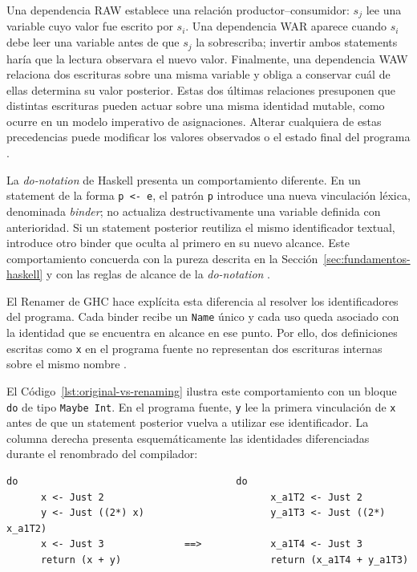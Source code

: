 Una dependencia RAW establece una relación productor--consumidor: $s_j$ lee una variable cuyo valor fue escrito por $s_i$. Una dependencia WAR aparece cuando $s_i$ debe leer una variable antes de que $s_j$ la sobrescriba; invertir ambos statements haría que la lectura observara el nuevo valor. Finalmente, una dependencia WAW relaciona dos escrituras sobre una misma variable y obliga a conservar cuál de ellas determina su valor posterior. Estas dos últimas relaciones presuponen que distintas escrituras pueden actuar sobre una misma identidad mutable, como ocurre en un modelo imperativo de asignaciones. Alterar cualquiera de estas precedencias puede modificar los valores observados o el estado final del programa \cite{Bernstein1966,ErtlKrall1996}.

La \textit{do-notation} de \textsf{Haskell} presenta un comportamiento diferente. En un statement de la forma \verb|p <- e|, el patrón \verb|p| introduce una nueva vinculación léxica, denominada \textit{binder}; no actualiza destructivamente una variable definida con anterioridad. Si un statement posterior reutiliza el mismo identificador textual, introduce otro binder que oculta al primero en su nuevo alcance. Este comportamiento concuerda con la pureza descrita en la Sección~\ref{sec:fundamentos-haskell} y con las reglas de alcance de la \textit{do-notation} \cite[sección~3.14]{Haskell2010}.

El Renamer de \textsf{GHC} hace explícita esta diferencia al resolver los identificadores del programa. Cada binder recibe un \texttt{Name} único y cada uso queda asociado con la identidad que se encuentra en alcance en ese punto. Por ello, dos definiciones escritas como \texttt{x} en el programa fuente no representan dos escrituras internas sobre el mismo nombre \cite{Appel1998,GHCRenamerSources2026}.

El Código~\ref{lst:original-vs-renaming} ilustra este comportamiento con un bloque \texttt{do} de tipo \texttt{Maybe Int}. En el programa fuente, \texttt{y} lee la primera vinculación de \texttt{x} antes de que un statement posterior vuelva a utilizar ese identificador. La columna derecha presenta esquemáticamente las identidades diferenciadas durante el renombrado del compilador:

\noindent\begin{minipage}{\textwidth}
\begin{lstlisting}[style=haskell,caption={Representación esquemática de los binders antes y después del renombrado que ejecuta \textsf{GHC} a todo programa.},label={lst:original-vs-renaming}]
    do                                      do
      x <- Just 2                             x_a1T2 <- Just 2
      y <- Just ((2*) x)                      y_a1T3 <- Just ((2*) x_a1T2)
      x <- Just 3              ==>            x_a1T4 <- Just 3
      return (x + y)                          return (x_a1T4 + y_a1T3)
\end{lstlisting}
\end{minipage}

